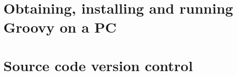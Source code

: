 \documentclass[11pt,a4paper]{book}
\begin{document}







\appendix

\chapter{Obtaining, installing and running Groovy on a PC}
\label{sec:obta-inst-runn}


\chapter{Source code version control}
\label{sec:source-code-version}

\end{document}
